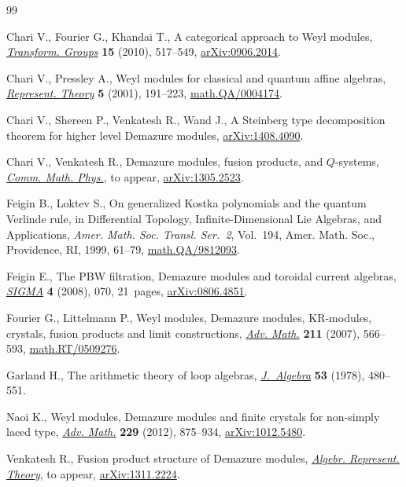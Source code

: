 \documentclass[pdftex]{sigma}
\numberwithin{equation}{section}
\begin{document}
\begin{thebibliography}{99}
\footnotesize \itemsep=0pt

Chari V., Fourier G., Khandai T., A categorical approach to {W}eyl modules,
  \href{http://dx.doi.org/10.1007/s00031-010-9090-9}{\textit{Transform. Groups}} \textbf{15} (2010), 517--549, \href{http://arxiv.org/abs/0906.2014}{arXiv:0906.2014}.

Chari V., Pressley A., Weyl modules for classical and quantum af\/fine algebras,
  \href{http://dx.doi.org/10.1090/S1088-4165-01-00115-7}{\textit{Represent. Theory}} \textbf{5} (2001), 191--223,
  \href{http://arxiv.org/abs/math.QA/0004174}{math.QA/0004174}.

Chari V., Shereen P., Venkatesh R., Wand J., A Steinberg type decomposition
  theorem for higher level Demazure modules, \href{http://arxiv.org/abs/1408.4090}{arXiv:1408.4090}.

Chari V., Venkatesh R., Demazure modules, fusion products, and $Q$-systems,
  \href{http://dx.doi.org/10.1007/s00220-014-2175-x}{\textit{Comm. Math. Phys.}}, {t}o appear, \href{http://arxiv.org/abs/1305.2523}{arXiv:1305.2523}.

Feigin B., Loktev S., On generalized {K}ostka polynomials and the quantum
  {V}erlinde rule, in Dif\/ferential Topology, Inf\/inite-Dimensional {L}ie
  Algebras, and Applications, \textit{Amer. Math. Soc. Transl. Ser.~2}, Vol.~194, Amer. Math. Soc., Providence, RI, 1999, 61--79,
  \href{http://arxiv.org/abs/math.QA/9812093}{math.QA/9812093}.

Feigin E., The {PBW} f\/iltration, {D}emazure modules and toroidal current
  algebras, \href{http://dx.doi.org/10.3842/SIGMA.2008.070}{\textit{SIGMA}} \textbf{4} (2008), 070, 21~pages,
  \href{http://arxiv.org/abs/0806.4851}{arXiv:0806.4851}.

Fourier G., Littelmann P., Weyl modules, {D}emazure modules, {KR}-modules,
  crystals, fusion products and limit constructions, \href{http://dx.doi.org/10.1016/j.aim.2006.09.002}{\textit{Adv. Math.}}
  \textbf{211} (2007), 566--593, \href{http://arxiv.org/abs/math.RT/0509276}{math.RT/0509276}.

Garland H., The arithmetic theory of loop algebras, \href{http://dx.doi.org/10.1016/0021-8693(78)90294-6}{\textit{J.~Algebra}}
  \textbf{53} (1978), 480--551.

Naoi K., Weyl modules, {D}emazure modules and f\/inite crystals for non-simply
  laced type, \href{http://dx.doi.org/10.1016/j.aim.2011.10.005}{\textit{Adv. Math.}} \textbf{229} (2012), 875--934,
  \href{http://arxiv.org/abs/1012.5480}{arXiv:1012.5480}.

Venkatesh R., Fusion product structure of Demazure modules, \href{http://dx.doi.org/10.1007/s10468-014-9495-6}{\textit{Algebr.
  Represent. Theory}}, {t}o appear, \href{http://arxiv.org/abs/1311.2224}{arXiv:1311.2224}.

\end{thebibliography}\LastPageEnding
\end{document}
